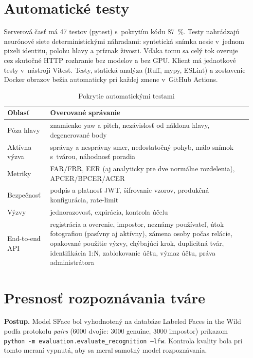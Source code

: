 \section{Automatické testy}

Serverová časť má 47 testov (pytest) s~pokrytím kódu 87~\%. Testy nahrádzajú neurónové
siete deterministickými náhradami: syntetická snímka nesie v~jednom pixeli identitu,
polohu hlavy a príznak živosti. Vďaka tomu sa celý tok overuje cez skutočné HTTP
rozhranie bez modelov a bez GPU. Klient má jednotkové testy v~nástroji Vitest. Testy,
statická analýza (Ruff, mypy, ESLint) a zostavenie Docker obrazov bežia automaticky
pri každej zmene v~GitHub Actions.

\begin{table}[H]
  \centering
  \caption{Pokrytie automatickými testami}
  \label{tab:testy}
  \small
  \begin{tabularx}{\textwidth}{@{}l X@{}}
    \toprule
    Oblasť & Overované správanie \\
    \midrule
    Póza hlavy & znamienko yaw a pitch, nezávislosť od náklonu hlavy, degenerované body \\
    Aktívna výzva & správny a nesprávny smer, nedostatočný pohyb, málo snímok s~tvárou, náhodnosť poradia \\
    Metriky & FAR/FRR, EER (aj analyticky pre dve normálne rozdelenia), APCER/BPCER/ACER \\
    Bezpečnosť & podpis a platnosť JWT, šifrovanie vzorov, produkčná konfigurácia, rate-limit \\
    Výzvy & jednorazovosť, expirácia, kontrola účelu \\
    End-to-end API & registrácia a overenie, impostor, neznámy používateľ, útok fotografiou (pasívny aj aktívny), zámena osoby počas relácie, opakované použitie výzvy, chýbajúci krok, duplicitná tvár, identifikácia 1:N, zablokovanie účtu, výmaz účtu, práva administrátora \\
    \bottomrule
  \end{tabularx}
\end{table}

\section{Presnosť rozpoznávania tváre}

\textbf{Postup.} Model SFace bol vyhodnotený na databáze Labeled Faces in the Wild
podľa protokolu \emph{pairs} (6000 dvojíc: 3000 genuine, 3000 impostor) príkazom
\texttt{python -m evaluation.evaluate\_recognition --lfw}. Kontrola kvality bola pri
tomto meraní vypnutá, aby sa meral samotný model rozpoznávania.

